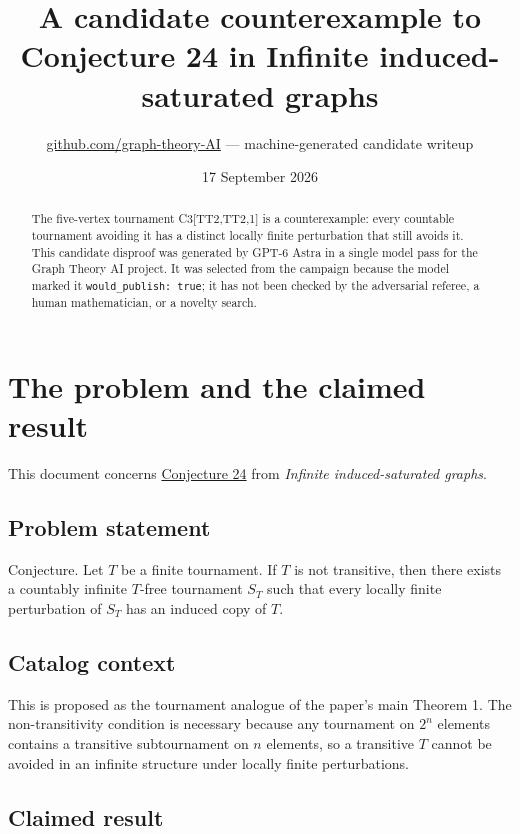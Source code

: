 \documentclass[
  11pt,
  a4paper,
]{article}
\title{A candidate counterexample to Conjecture 24 in Infinite
induced-saturated graphs}
\author{\href{https://github.com/graph-theory-AI}{github.com/graph-theory-AI}
--- machine-generated candidate writeup}
\date{17 September 2026}
\begin{document}
\maketitle
\begin{abstract}
The five-vertex tournament C3{[}TT2,TT2,1{]} is a counterexample: every
countable tournament avoiding it has a distinct locally finite
perturbation that still avoids it. This candidate disproof was generated
by GPT-6 Astra in a single model pass for the Graph Theory AI project.
It was selected from the campaign because the model marked it
\texttt{would\_publish:\ true}; it has not been checked by the
adversarial referee, a human mathematician, or a novelty search.
\end{abstract}

\section{The problem and the claimed
result}\label{the-problem-and-the-claimed-result}

This document concerns
\href{https://graph-theory-ai.github.io/graph-conjectures/arxiv/2506.08810__03/}{Conjecture
24} from \emph{Infinite induced-saturated graphs}.

\subsection{Problem statement}\label{problem-statement}

Conjecture. Let \(T\) be a finite tournament. If \(T\) is not
transitive, then there exists a countably infinite \(T\)-free tournament
\(S_{T}\) such that every locally finite perturbation of \(S_{T}\) has
an induced copy of \(T\).

\subsection{Catalog context}\label{catalog-context}

This is proposed as the tournament analogue of the paper's main Theorem
1. The non-transitivity condition is necessary because any tournament on
\(2^n\) elements contains a transitive subtournament on \(n\) elements,
so a transitive \(T\) cannot be avoided in an infinite structure under
locally finite perturbations.

\subsection{Claimed result}\label{claimed-result}
\end{document}
